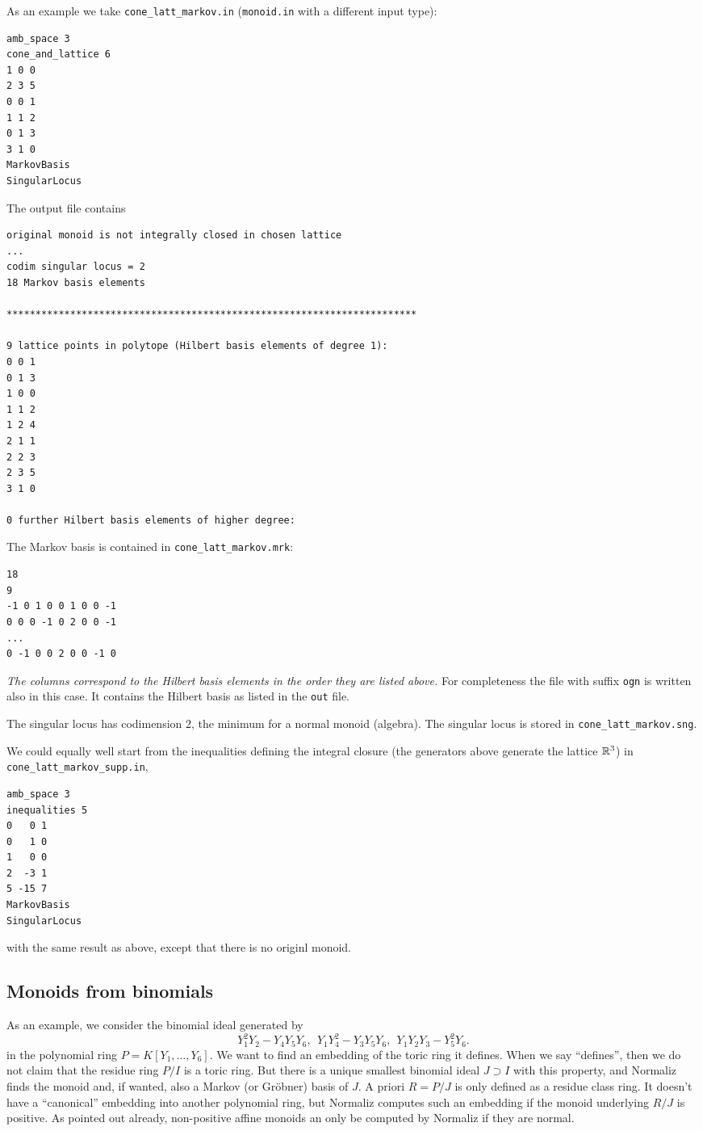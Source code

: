 As an example we take \verb|cone_latt_markov.in| (\verb|monoid.in| with a different input type):
\begin{Verbatim}
amb_space 3
cone_and_lattice 6
1 0 0
2 3 5
0 0 1
1 1 2
0 1 3
3 1 0
MarkovBasis
SingularLocus
\end{Verbatim}

The output file contains
\begin{Verbatim}
original monoid is not integrally closed in chosen lattice
...
codim singular locus = 2
18 Markov basis elements

***********************************************************************

9 lattice points in polytope (Hilbert basis elements of degree 1):
0 0 1
0 1 3
1 0 0
1 1 2
1 2 4
2 1 1
2 2 3
2 3 5
3 1 0

0 further Hilbert basis elements of higher degree:
\end{Verbatim}
The Markov basis is contained in \verb|cone_latt_markov.mrk|:
\begin{Verbatim}
18
9
-1 0 1 0 0 1 0 0 -1 
0 0 0 -1 0 2 0 0 -1 
...
0 -1 0 0 2 0 0 -1 0 
\end{Verbatim}
\emph{The columns correspond to the Hilbert basis elements in the order they are listed above.} For completeness the file with suffix \verb|ogn| is written also in this case. It contains the Hilbert basis as listed in the \verb|out| file.

The singular locus has codimension $2$, the minimum for a normal monoid (algebra). The singular locus is stored in \verb|cone_latt_markov.sng|.

We could equally well start from the inequalities defining the integral closure (the generators above generate the lattice ${\mathbb R}^3$) in \verb|cone_latt_markov_supp.in|,
\begin{Verbatim}
amb_space 3
inequalities 5
0   0 1
0   1 0
1   0 0
2  -3 1
5 -15 7
MarkovBasis
SingularLocus
\end{Verbatim}
with the same result as above, except that there is no originl monoid.

\subsection{Monoids from binomials}\label{binom_ex}

As an example, we consider the binomial ideal generated by
$$
Y_1^2Y_2-Y_4Y_5Y_6,\ \ Y_1Y_4^2-Y_3Y_5Y_6,\ \ Y_1Y_2Y_3-Y_5^2Y_6.
$$
in the polynomial ring $P=K[Y_1,\dots, Y_6]$. We want to find an embedding of the toric ring it defines. When we say ``defines'', then we do not claim that the residue ring  $P/I$ is a toric ring. But there is a unique smallest binomial ideal $J\supset I$ with this property, and Normaliz finds the monoid and, if wanted, also a Markov (or Gröbner) basis of $J$. A priori $R=P/J$ is only defined as a residue class ring. It doesn't have a ``canonical'' embedding into another polynomial ring, but Normaliz computes such an embedding if the monoid underlying $R/J$ is positive. As pointed out already, non-positive affine monoids an only be computed by Normaliz if they are normal.


